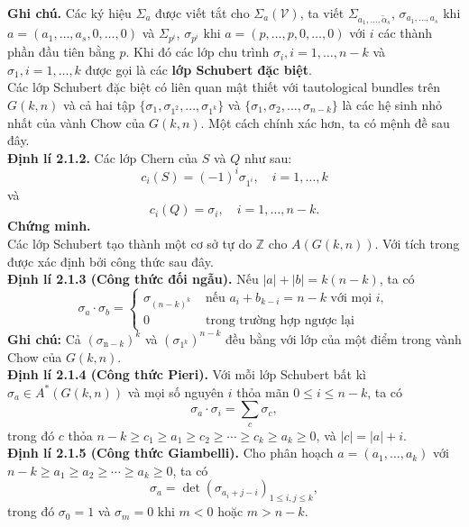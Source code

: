 \documentclass[11pt,a4paper]{book}
\begin{document}
\textbf{Ghi chú.} 
Các ký hiệu \( \Sigma_a \) được viết tắt cho \( \Sigma_a(\mathcal{V}) \), ta viết \( \Sigma_{a_1, \ldots, \tilde{\alpha}_s} \), \( \sigma_{a_1, \ldots, a_s} \) khi \( a=\left(a_1, \ldots, a_s, 0, \ldots, 0\right) \) và \( \Sigma_{p^i} \), \( \sigma_{p^i} \) khi \( a=(p, \ldots, p, 0, \ldots, 0) \) với \( i \) các thành phần đầu tiên bằng \( p \). Khi đó các lớp chu trình \( \sigma_i, i=1, \ldots, n-k \) và \( \sigma_1, i=1, \ldots, k \) được gọi là các \textbf{lớp Schubert đặc biệt}.\\
Các lớp Schubert đặc biệt có liên quan mật thiết với tautological bundles trên $G(k,n)$ và cả hai tập $\{\sigma_{1},\sigma_{1^2},...,\sigma_{1^k}\}$ và $\{\sigma_{1},\sigma_2,...,\sigma_{n-k}\}$ là các hệ sinh nhỏ nhất của vành Chow của $G(k,n)$. Một cách chính xác hơn, ta có mệnh đề sau đây.\\
\textbf{Định lí 2.1.2.}
Các lớp Chern của \( S \) và \( Q \) như sau:
\[
c_i(S)=(-1)^i \sigma_{1^i}, \quad i=1, \ldots, k
\]
và
\[
c_i(Q)=\sigma_i, \quad i=1, \ldots, n-k.
\]
\textbf{Chứng minh.}\\
Các lớp Schubert tạo thành một cơ sở tự do $\mathbb{Z}$ cho $A(G(k,n))$. Với tích trong được xác định bởi công thức sau đây.\\
\textbf{Định lí 2.1.3 (Công thức đối ngẫu).}
Nếu \( |a|+|b|=k(n-k) \), ta có
\[
\sigma_a \cdot \sigma_b= \begin{cases}\sigma_{(n-k)^k} & \text{ nếu } a_i+b_{k-i}=n-k \text{ với mọi } i, \\ 0 & \text{ trong trường hợp ngược lại }\end{cases}
\]
\textbf{Ghi chú:} 
Cả \( \left(\sigma_{\mathrm{n}-k}\right)^k \) và \( \left(\sigma_{1^k}\right)^{n-k} \) đều bằng với lớp của một điểm trong vành Chow của \( G(k, n) \).\\
\textbf{Định lí 2.1.4 (Công thức Pieri).}
Với mỗi lớp Schubert bất kì \( \sigma_a \in A^*(G(k, n)) \) và mọi số nguyên \( i \) thỏa mãn \( 0 \leq i \leq n-k \), ta có
\[
\sigma_a \cdot \sigma_i=\sum_c \sigma_c,
\]
trong đó \( c \) thỏa \( n-k \geq c_1 \geq a_1 \geq c_2 \geq \cdots \geq c_k \geq a_k \geq 0 \), và \( |c|=|a|+i \).\\
\textbf{Định lí 2.1.5 (Công thức Giambelli).}
Cho phân hoạch \( a=\left(a_1, \ldots, a_k\right) \) với \( n-k \geq a_1 \geq a_2 \geq \cdots \geq a_k \geq 0 \), ta có
\[
\sigma_a=\operatorname{det}\left(\sigma_{a_i+j-i}\right)_{1 \leq i, j \leq k},
\]
trong đó \( \sigma_0=1 \) và \( \sigma_m=0 \) khi \( m<0 \) hoặc \( m>n-k \).\\
\end{document}
